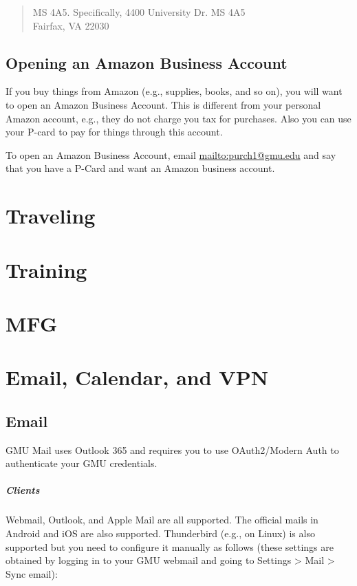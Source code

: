 \documentclass[oneside,11pt,dvipsnames]{book}
\begin{document}
\begin{quote}
MS 4A5.  Specifically,  4400 University Dr. MS 4A5\\
Fairfax, VA 22030
\end{quote}


\section{Opening an Amazon Business Account}
If you buy things from Amazon (e.g., supplies, books, and so on), you will want to open an Amazon Business Account. This is different from your personal Amazon account, e.g., they do not charge you tax for purchases. Also you can use your P-card to pay for things through this account.  

To open an Amazon Business Account, email \url{mailto:purch1@gmu.edu} and say that you have a P-Card and want an Amazon business account.



\chapter{Traveling}
\chapter{Training}

\chapter{MFG}


\chapter{Email, Calendar, and VPN}

\section{Email}
GMU Mail uses Outlook 365 and requires you to use OAuth2/Modern Auth to authenticate your GMU credentials.  

\paragraph{Clients} Webmail, Outlook, and Apple Mail are all supported.  The official mails in Android and iOS are also supported. Thunderbird (e.g., on Linux) is also supported but you need to configure it manually as follows (these settings are obtained by logging in to your GMU webmail and going to Settings > Mail > Sync email):
\end{document}
